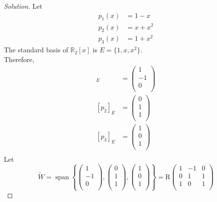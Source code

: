 \documentclass[fleqn, a4paper, 12pt]{article}
\theoremstyle{definition}
\theoremstyle{theorem}
\newenvironment{solution}
{\begin{proof}[Solution]\let\qed\relax}
	{\end{proof}}
\DeclareMathOperator{\vspan}{\mathrm{span}} %
\begin{document}
\begin{solution}
	Let 
	\begin{align*}
		p_1 (x) &= 1 - x\\
		p_2 (x) &= x + x^2\\
		p_3 (x) &= 1 + x^2
	\end{align*}
	The standard basis of $\mathbb{R}_2 [x]$ is $E = \{1, x, x^2\}$.\\
	Therefore,
	\begin{align*}
		[p_1]_E
		&=
		\begin{pmatrix}
			1\\
			-1\\
			0\\
		\end{pmatrix}\\
		[p_2]_E
		&=
		\begin{pmatrix}
			0\\
			1\\
			1\\
		\end{pmatrix}\\
		[p_3]_E
		&=
		\begin{pmatrix}
			1\\
			0\\
			1\\
		\end{pmatrix}\\
	\end{align*}
	Let 
	\begin{equation*}
		\tilde{W} = \vspan 
		\left\lbrace 
			\begin{pmatrix}
				1\\
				-1\\
				0\\
			\end{pmatrix}
			,
			\begin{pmatrix}
				0\\
				1\\
				1\\
			\end{pmatrix}
			,
			\begin{pmatrix}
				1\\
				0\\
				1\\
			\end{pmatrix}
		\right\rbrace 
		= \mathrm{R} 
		\begin{pmatrix}
			1 & -1 & 0\\
			0 & 1 & 1\\
			1 & 0 & 1\\

\end{pmatrix}
\end{equation*}
\end{solution}
\end{document}
